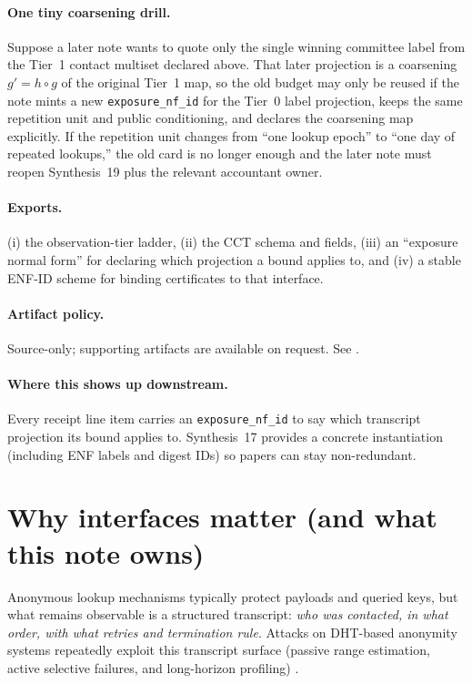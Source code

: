 \documentclass[11pt]{article}
\begin{document}
\paragraph{One tiny coarsening drill.}
Suppose a later note wants to quote only the single winning committee label from the Tier~1 contact multiset declared above.
That later projection is a coarsening $g' = h \circ g$ of the original Tier~1 map, so the old budget may only be reused if the note mints a new \texttt{exposure\_nf\_id} for the Tier~0 label projection, keeps the same repetition unit and public conditioning, and declares the coarsening map explicitly.
If the repetition unit changes from ``one lookup epoch'' to ``one day of repeated lookups,'' the old card is no longer enough and the later note must reopen Synthesis~19 plus the relevant accountant owner.

\paragraph{Exports.}
(i) the observation-tier ladder, (ii) the CCT schema and fields, (iii) an ``exposure normal form'' for declaring which projection a bound applies to, and (iv) a stable ENF-ID scheme for binding certificates to that interface.

\paragraph{Artifact policy.}
Source-only; supporting artifacts are available on request. See \cite{series:artifactpolicy}.


\paragraph{Where this shows up downstream.}
Every receipt line item carries an \texttt{exposure\_nf\_id} to say which transcript projection its bound applies to.\cite{series:receiptitems}
Synthesis~17 provides a concrete instantiation (including ENF labels and digest IDs) so papers can stay non-redundant.\cite{series:workedexample}

\section{Why interfaces matter (and what this note owns)}
Anonymous lookup mechanisms typically protect payloads and queried keys, but what remains observable is a structured transcript: \emph{who was contacted, in what order, with what retries and termination rule}.
Attacks on DHT-based anonymity systems repeatedly exploit this transcript surface (passive range estimation, active selective failures, and long-horizon profiling) \cite{WangMittalBorisovCCS2010,MittalBorisov2012InfoLeaks,WangOctopus2012}.
\end{document}

